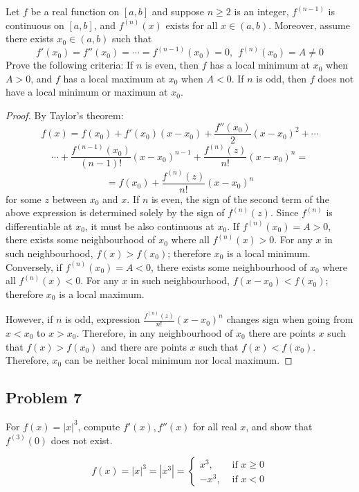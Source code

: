 \documentclass{article}
\begin{document}
\begin{tcolorbox}
Let $f$ be a real function on $[a, b]$ and suppose $n \geq 2$ is an integer, $f^{(n-1)}$ is continuous on $[a, b]$, and $f^{(n)}(x)$ exists for all $x \in (a, b)$. Moreover, assume there exists $x_0 \in (a, b)$ such that
$$ f'(x_0) = f''(x_0) = \cdots = f^{(n-1)}(x_0) = 0, \>\> f^{(n)}(x_0) = A \neq 0$$
Prove the following criteria: If $n$ is even, then $f$ has a local minimum at $x_0$ when $A > 0$, and $f$ has a local maximum at $x_0$ when $A < 0$. If $n$ is odd, then $f$ does not have a local minimum or maximum at $x_0$.
\end{tcolorbox}
\begin{proof}
By Taylor's theorem:
$$ f(x) = f(x_0) + f'(x_0)(x-x_0) + \frac{f''(x_0)}{2}(x-x_0)^2 + \cdots $$
$$ \cdots + \frac{f^{(n-1)}(x_0)}{(n-1)!}(x-x_0)^{n-1} + \frac{f^{(n)}(z)}{n!}(x-x_0)^n = $$
$$ = f(x_0) + \frac{f^{(n)}(z)}{n!}(x-x_0)^n $$
for some $z$ between $x_0$ and $x$.
If $n$ is even, the sign of the second term of the above expression is determined solely by the sign of $f^{(n)}(z)$.
Since $f^{(n)}$ is differentiable at $x_0$, it must be also continuous at $x_0$. If $f^{(n)}(x_0) = A > 0$, there exists some neighbourhood of $x_0$ where all $f^{(n)}(x)>0$. For any $x$ in such neighbourhood, $f(x) > f(x_0)$; therefore $x_0$ is a local minimum. Conversely, if $f^{(n)}(x_0) = A < 0$, there exists some neighbourhood of $x_0$ where all $f^{(n)}(x)<0$. For any $x$ in such neighbourhood, $f(x-x_0) < f(x_0)$; therefore $x_0$ is a local maximum.

However, if $n$ is odd, expression $\frac{f^{(n)}(z)}{n!}(x-x_0)^n$ changes sign when going from $x < x_0$ to $x > x_0$. Therefore, in any neighbourhood of $x_0$ there are points $x$ such that $f(x)>f(x_0)$ and there are points $x$ such that $f(x)<f(x_0)$. Therefore, $x_0$ can be neither local minimum nor local maximum.
\end{proof}


\subsection*{Problem 7}

\begin{tcolorbox}
For $f(x) = |x|^3$, compute $f'(x), f''(x)$ for all real $x$, and show that $f^{(3)}(0)$ does not exist.
\end{tcolorbox}

$$ f(x) = |x|^3 = |x^3| = \begin{cases}
        x^3, & \text{ if $x \geq 0$} \\
        -x^3, & \text{ if $x < 0$}
    \end{cases}
$$
\end{document}
